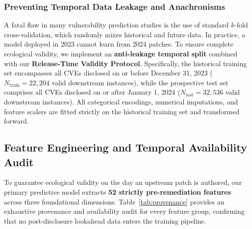 \documentclass[final,5p,times,twocolumn]{elsarticle}
\begin{document}
\subsubsection{Preventing Temporal Data Leakage and Anachronisms}
A fatal flaw in many vulnerability prediction studies is the use of standard $k$-fold cross-validation, which randomly mixes historical and future data. In practice, a model deployed in 2023 cannot learn from 2024 patches. To ensure complete ecological validity, we implement an \textbf{anti-leakage temporal split} combined with our \textbf{Release-Time Validity Protocol}. Specifically, the historical training set encompasses all CVEs disclosed on or before December 31, 2023 ($N_{\text{train}} = 22,204$ valid downstream instances), while the prospective test set comprises all CVEs disclosed on or after January 1, 2024 ($N_{\text{test}} = 32,536$ valid downstream instances). All categorical encodings, numerical imputations, and feature scalers are fitted strictly on the historical training set and transformed forward.

\subsection{Feature Engineering and Temporal Availability Audit}
To guarantee ecological validity on the day an upstream patch is authored, our primary predictive model extracts \textbf{52 strictly pre-remediation features} across three foundational dimensions. Table~\ref{tab:provenance} provides an exhaustive provenance and availability audit for every feature group, confirming that no post-disclosure lookahead data enters the training pipeline.
\end{document}
